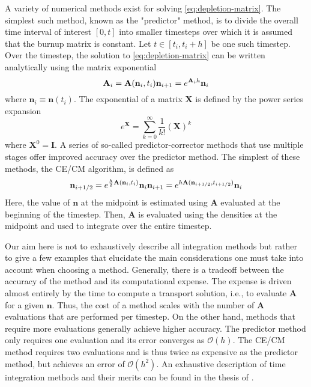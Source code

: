 \documentclass[3p,authoryear]{elsarticle}
\begin{document}
A variety of numerical methods exist for solving \cref{eq:depletion-matrix}. The
simplest such method, known as the "predictor" method, is to divide the overall
time interval of interest $[0,t]$ into smaller timesteps over which it is
assumed that the burnup matrix is constant. Let $t \in [t_i, t_i + h]$ be one
such timestep. Over the timestep, the solution to \cref{eq:depletion-matrix} can
be written analytically using the matrix exponential
\begin{equation}
    \mathbf{A}_i = \mathbf{A}(\mathbf{n}_i, t_i) \\
    \mathbf{n}_{i+1} = e^{\mathbf{A}_i h} \mathbf{n}_i
\end{equation}
where $\mathbf{n}_i \equiv \mathbf{n}(t_i)$. The exponential of a matrix
$\mathbf{X}$ is defined by the power series expansion
\begin{equation}
    e^{\mathbf{X}} = \sum\limits_{k=0}^\infty \frac{1}{k!} \left ( \mathbf{X}
    \right )^k
\end{equation}
where $\mathbf{X}^0 = \mathbf{I}$. A series of so-called predictor-corrector
methods that use multiple stages offer improved accuracy over the predictor
method. The simplest of these methods, the CE/CM algorithm, is defined as
\begin{equation}
    \mathbf{n}_{i+1/2} = e^{\frac{h}{2}\mathbf{A}(\mathbf{n}_i, t_i)} \mathbf{n}_i \\
    \mathbf{n}_{i+1} = e^{h \mathbf{A}(\mathbf{n}_{i+1/2},t_{i+1/2})} \mathbf{n}_i
\end{equation}
Here, the value of $\mathbf{n}$ at the midpoint is estimated using
$\mathbf{A}$ evaluated at the beginning of the timestep. Then,
$\mathbf{A}$ is evaluated using the densities at the midpoint and used to
integrate over the entire timestep.

Our aim here is not to exhaustively describe all integration methods but rather
to give a few examples that elucidate the main considerations one must take into
account when choosing a method. Generally, there is a tradeoff between the
accuracy of the method and its computational expense. The expense is driven
almost entirely by the time to compute a transport solution, i.e., to evaluate
$\mathbf{A}$ for a given $\mathbf{n}$. Thus, the cost of a method scales with
the number of $\mathbf{A}$ evaluations that are performed per timestep. On the
other hand, methods that require more evaluations generally achieve higher
accuracy. The predictor method only requires one evaluation and its error
converges as $\mathcal{O}(h)$. The CE/CM method requires two evaluations and is
thus twice as expensive as the predictor method, but achieves an error of
$\mathcal{O}(h^2)$. An exhaustive description of time integration methods and
their merits can be found in the thesis of \citet{josey2017phd}.
\end{document}
